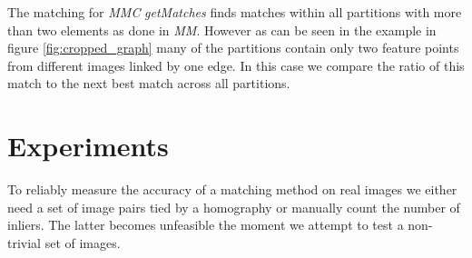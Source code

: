 \documentclass[12pt,journal]{IEEEtran}
\begin{document}
The matching for \emph{MMC} \emph{getMatches} finds matches within all 
partitions with more than two elements as done in \emph{MM}. However as 
can be seen in the example in figure \ref{fig:cropped_graph} many of the 
partitions contain only two feature points from different images linked 
by one edge. In this case we compare the ratio of this match to the next 
best match across all partitions.
%
%
\section{Experiments}
\label{experiment}
%
To reliably measure the accuracy of a matching method on real images we 
either need a set of image pairs tied by a homography or manually count 
the number of inliers. The latter becomes unfeasible the moment we 
attempt to test a non-trivial set of images. 
\end{document}
